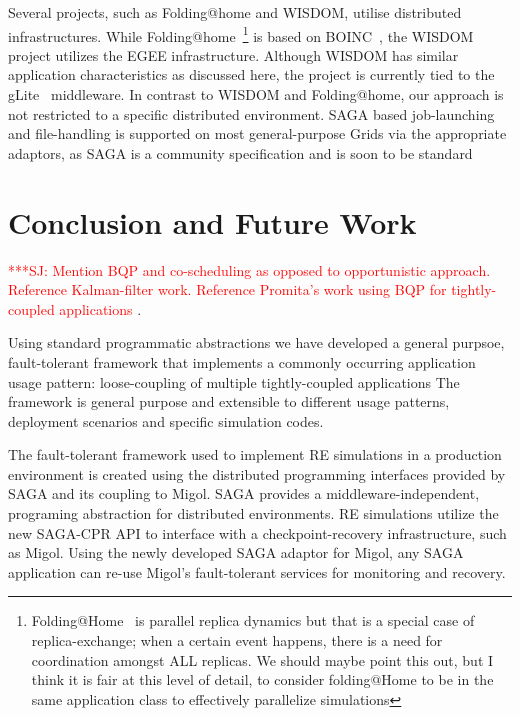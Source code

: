 \documentclass{rspublic}
\newcommand{\alnote}[1]{ {\textcolor{blue} { ***AL: #1 }}}
\newcommand{\jhanote}[1]{ {\textcolor{red} { ***SJ: #1 }}}
\newcommand{\alnote}[1]{}
\newcommand{\jhanote}[1]{}
\begin{document}
Several projects, such as Folding@home and WISDOM, utilise distributed
infrastructures. While
Folding@home~\citep{PhysRevLett.86.4983}\footnote{Folding@Home~\citep{PhysRevLett.86.4983}
  is parallel replica dynamics but that is a special case of
  replica-exchange; when a certain event happens, there is a need for
  coordination amongst ALL replicas. We should maybe point this out,
  but I think it is fair at this level of detail, to consider
  folding@Home to be in the same application class to effectively
  parallelize simulations} is based on BOINC~\citep{1033223}, the
WISDOM project utilizes the EGEE infrastructure. 
Although WISDOM has similar application characteristics as discussed
here, the project is currently tied to the gLite~\citep{glite}
middleware.  In contrast to WISDOM and Folding@home, our approach is
not restricted to a specific distributed environment. SAGA based
job-launching and file-handling is supported on most general-purpose
Grids via the appropriate adaptors, as SAGA is a community
specification and is soon to be standard~\citep{saga_url}


\section{Conclusion and Future Work}

\jhanote{Mention BQP and co-scheduling as opposed to opportunistic
  approach. Reference Kalman-filter work. Reference Promita's work
  using BQP for tightly-coupled applications}.

Using standard programmatic abstractions we have developed a general
purpsoe, fault-tolerant framework that implements a commonly occurring
application usage pattern: loose-coupling of multiple tightly-coupled
applications The framework is general purpose and extensible to
different usage patterns, deployment scenarios and specific simulation
codes.

The fault-tolerant framework used to implement RE simulations in a
production environment is created using the distributed programming
interfaces provided by SAGA and its coupling to Migol.  SAGA provides
a middleware-independent, programing abstraction for distributed
environments. RE simulations utilize the new SAGA-CPR API to interface
with a checkpoint-recovery infrastructure, such as Migol. Using the
newly developed SAGA adaptor for Migol, any SAGA application can
re-use Migol's fault-tolerant services for monitoring and recovery.
\end{document}
